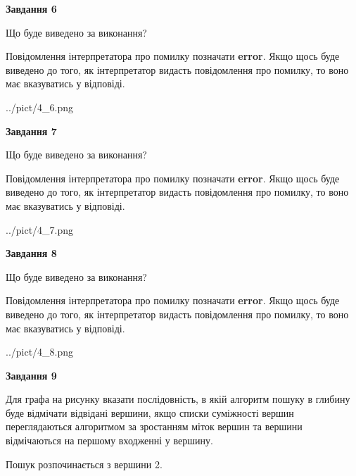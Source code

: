 \documentclass[12pt, ukrainian]{article}
\begin{document}
{\begin {large}
{\begin {center}\textbf{Завдання 6}\end {center}}\par
Що буде виведено за виконання?

Повідомлення інтерпретатора про помилку позначати \textbf{error}.
Якщо щось буде виведено до того, як інтерпретатор видасть повідомлення про помилку, 
то воно має вказуватись у відповіді. \par


\begin{center}
	{../pict/4_6.png}
\end{center}
\newpage

{\begin {center}\textbf{Завдання 7}\end {center}}\par
Що буде виведено за виконання?

Повідомлення інтерпретатора про помилку позначати \textbf{error}.
Якщо щось буде виведено до того, як інтерпретатор видасть повідомлення про помилку, 
то воно має вказуватись у відповіді. \par


\begin{center}
	{../pict/4_7.png}
\end{center}
\newpage

{\begin {center}\textbf{Завдання 8}\end {center}}\par
Що буде виведено за виконання?

Повідомлення інтерпретатора про помилку позначати \textbf{error}.
Якщо щось буде виведено до того, як інтерпретатор видасть повідомлення про помилку, 
то воно має вказуватись у відповіді. \par


\begin{center}
	{../pict/4_8.png}
\end{center}
\newpage

{\begin {center}\textbf{Завдання 9}\end {center}}\par
Для графа на рисунку вказати послідовність, в якій алгоритм пошуку в глибину буде відмічати відвідані вершини, якщо списки суміжності вершин переглядаються алгоритмом за зростанням міток вершин та вершини відмічаються на першому вход\-женні у вершину.\par
Пошук розпочинається з вершини 2.\par


\end{large}}
\end{document}
